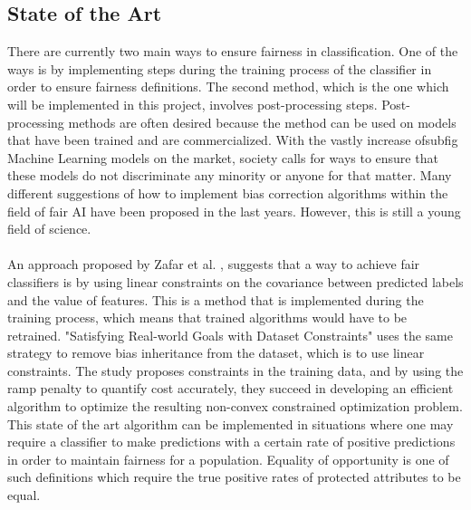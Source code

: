 \documentclass[11pt, fleqn, titlepage]{article}
\begin{document}
	
	\subsection{State of the Art}
	There are currently two main ways to ensure fairness in classification. One of the ways is by implementing steps during the training process of the classifier in order to ensure fairness definitions. The second method, which is the one which will be implemented in this project, involves post-processing steps. Post-processing methods are often desired because the method can be used on models that have been trained and are commercialized. With the vastly increase ofsubfig Machine Learning models on the market, society calls for ways to ensure that these models do not discriminate any minority or anyone for that matter. Many different suggestions of how to implement bias correction algorithms within the field of fair AI have been proposed in the last years. However, this is still a young field of science.\\\\
	\noindent
	An approach proposed by Zafar et al. \cite{Zafar}, suggests that a way to achieve fair classifiers is by using linear constraints on the covariance between predicted labels and the value of features. This is a method that is implemented during the training process, which means that trained algorithms would have to be retrained. "Satisfying Real-world Goals with Dataset Constraints" uses the same strategy to remove bias inheritance from the dataset, which is to use linear constraints. The study proposes constraints in the training data, and by using the ramp penalty to quantify cost accurately, they succeed in developing an efficient algorithm to optimize the resulting non-convex constrained optimization problem. This state of the art algorithm can be implemented in situations where one may require a classifier to make predictions with a certain rate of positive predictions in order to maintain fairness for a population. Equality of opportunity is one of such definitions which require the true positive rates of protected attributes to be equal. \cite{g_goh} \\
	
\end{document}
